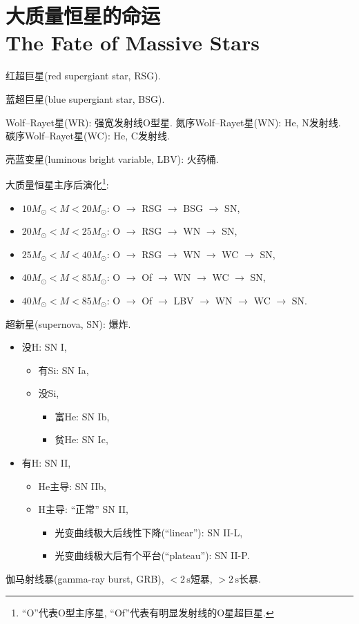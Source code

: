 \chapter{大质量恒星的命运\\The Fate of Massive Stars}

红超巨星(red supergiant star, RSG).

蓝超巨星(blue supergiant star, BSG).

Wolf--Rayet星(WR): 强宽发射线O型星. 氮序Wolf--Rayet星(WN): He, N发射线. 碳序Wolf--Rayet星(WC): He, C发射线.

亮蓝变星(luminous bright variable, LBV): 火药桶.

大质量恒星主序后演化\footnote{``O''代表O型主序星, ``Of''代表有明显发射线的O星超巨星.}:
\begin{itemize}
    \item $10M_\odot<M<20M_\odot$: O $\to$ RSG $\to$ BSG $\to$ SN,
    \item $20M_\odot<M<25M_\odot$: O $\to$ RSG $\to$ WN $\to$ SN,
    \item $25M_\odot<M<40M_\odot$: O $\to$ RSG $\to$ WN $\to$ WC $\to$ SN,
    \item $40M_\odot<M<85M_\odot$: O $\to$ Of $\to$ WN $\to$ WC $\to$ SN,
    \item $40M_\odot<M<85M_\odot$: O $\to$ Of $\to$ LBV $\to$ WN $\to$ WC $\to$ SN.
\end{itemize}

超新星(supernova, SN): 爆炸.
\begin{itemize}
    \item 没H: SN I,
    \begin{itemize}
        \item 有Si: SN Ia,
        \item 没Si,
        \begin{itemize}
            \item 富He: SN Ib,
            \item 贫He: SN Ic,
        \end{itemize}
    \end{itemize}
    \item 有H: SN II,
    \begin{itemize}
        \item He主导: SN IIb,
        \item H主导: ``正常'' SN II,
        \begin{itemize}
            \item 光变曲线极大后线性下降(``linear''): SN II-L,
            \item 光变曲线极大后有个平台(``plateau''): SN II-P.
        \end{itemize}
    \end{itemize}
\end{itemize}

伽马射线暴(gamma-ray burst, GRB), $<2\,\text{s}$短暴, $>2\,\text{s}$长暴.
